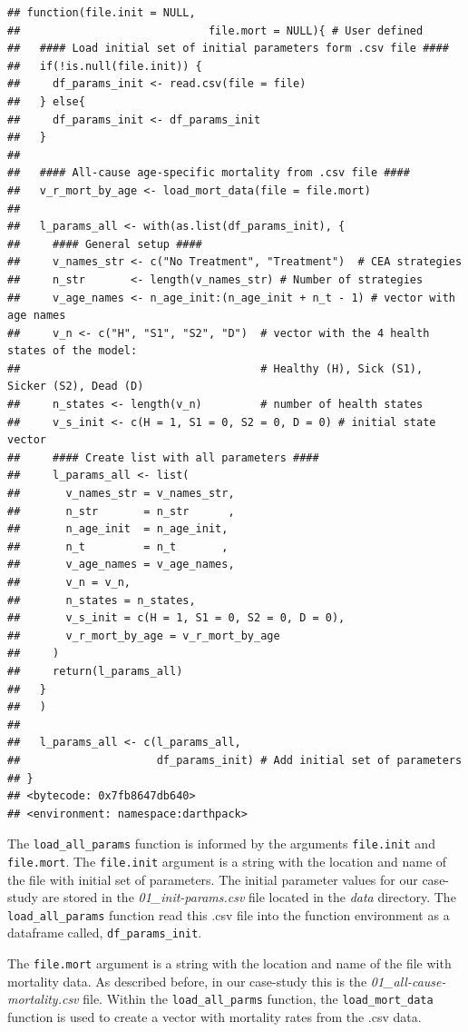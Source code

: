\documentclass[]{book}
\begin{document}
\begin{verbatim}
## function(file.init = NULL,
##                             file.mort = NULL){ # User defined
##   #### Load initial set of initial parameters form .csv file ####
##   if(!is.null(file.init)) {
##     df_params_init <- read.csv(file = file)
##   } else{
##     df_params_init <- df_params_init
##   }
##   
##   #### All-cause age-specific mortality from .csv file ####
##   v_r_mort_by_age <- load_mort_data(file = file.mort)
##   
##   l_params_all <- with(as.list(df_params_init), {
##     #### General setup ####
##     v_names_str <- c("No Treatment", "Treatment")  # CEA strategies
##     n_str       <- length(v_names_str) # Number of strategies
##     v_age_names <- n_age_init:(n_age_init + n_t - 1) # vector with age names
##     v_n <- c("H", "S1", "S2", "D")  # vector with the 4 health states of the model:
##                                     # Healthy (H), Sick (S1), Sicker (S2), Dead (D)
##     n_states <- length(v_n)         # number of health states 
##     v_s_init <- c(H = 1, S1 = 0, S2 = 0, D = 0) # initial state vector
##     #### Create list with all parameters ####
##     l_params_all <- list(
##       v_names_str = v_names_str,
##       n_str       = n_str      ,
##       n_age_init  = n_age_init, 
##       n_t         = n_t       , 
##       v_age_names = v_age_names,
##       v_n = v_n,
##       n_states = n_states,
##       v_s_init = c(H = 1, S1 = 0, S2 = 0, D = 0),
##       v_r_mort_by_age = v_r_mort_by_age
##     )
##     return(l_params_all)
##   }
##   )
##   
##   l_params_all <- c(l_params_all, 
##                     df_params_init) # Add initial set of parameters
## }
## <bytecode: 0x7fb8647db640>
## <environment: namespace:darthpack>
\end{verbatim}

The \texttt{load\_all\_params} function is informed by the arguments
\texttt{file.init} and \texttt{file.mort}. The \texttt{file.init}
argument is a string with the location and name of the file with initial
set of parameters. The initial parameter values for our case-study are
stored in the \emph{01\_init-params.csv} file located in the \emph{data}
directory. The \texttt{load\_all\_params} function read this .csv file
into the function environment as a dataframe called,
\texttt{df\_params\_init}.

The \texttt{file.mort} argument is a string with the location and name
of the file with mortality data. As described before, in our case-study
this is the \emph{01\_all-cause-mortality.csv} file. Within the
\texttt{load\_all\_parms} function, the \texttt{load\_mort\_data}
function is used to create a vector with mortality rates from the .csv
data.
\end{document}
